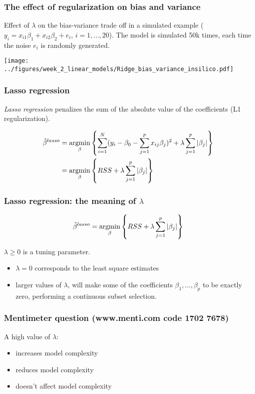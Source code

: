 \documentclass[notes]{beamer}          %
\newcommand{\argmin}{\operatornamewithlimits{argmin}}
\begin{document}
\begin{frame}
\frametitle{The effect of regularization on bias and variance}
Effect of $\lambda$ on the bias-variance trade off in a simulated example ($y_i = x_{i1}\beta_1 + x_{i2}\beta_2 + e_i$, $i=1,\dots, 20$). The model is simulated 50k times, each time the noise $e_i$ is randomly generated.




\begin{center}
\texttt{[image: ../figures/week\_2\_linear\_models/Ridge\_bias\_variance\_insilico.pdf]}
\end{center}

\end{frame}


\begin{frame}
\frametitle{Lasso regression}
\textit{Lasso regression} penalizes the sum of the absolute value of the coefficients (L1 regularization). 

\begin{align*}
\hat{\beta}^{lasso} &= \argmin_{\beta} \left\{ \sum_{i=1}^N (y_i - \beta_0 -  \sum_{j=1}^p x_{ij}\beta_j)^2 + \lambda \sum_{j=1}^p | \beta_j | \right\} \\
& =  \argmin_{\beta} \left\{ RSS + \lambda \sum_{j=1}^p | \beta_j | \right\}
\end{align*}

\end{frame}


\begin{frame}
\frametitle{Lasso regression: the meaning of $\lambda$}

\begin{equation*}
    \hat{\beta}^{lasso} =  \argmin_{\beta} \left\{ RSS + \lambda \sum_{j=1}^p | \beta_j | \right\}
\end{equation*}

$\lambda \geq 0$ is a tuning parameter.

\begin{itemize}
    \item $\lambda = 0$ corresponds to the least square estimates
    \item larger values of $\lambda$, will make some of the coefficients $\beta_1, \dots, \beta_p$ to be exactly zero, performing a continuous subset selection.
\end{itemize}
\end{frame}

\begin{frame}
\frametitle{Mentimeter question (www.menti.com code 1702 7678)}

A high value of $\lambda$:
\begin{itemize}
    \item increases model complexity
    \item reduces model complexity
    \item doesn't affect model complexity
\end{itemize}
\end{frame}
\end{document}
